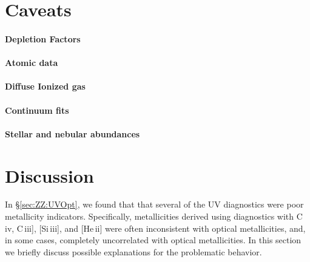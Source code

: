 \documentclass[preprint2]{aastex62}
\newcommand{\heii}{[He\,{\sc ii}]\xspace}
\newcommand{\civ}{C\,{\sc iv}\xspace}
\newcommand{\SiuIII}{[Si\,{\sc iii}]\xspace}
\newcommand{\ciii}{C\,{\sc iii}]\xspace}
\begin{document}
\section{Caveats}\label{sec:caveats}

\paragraph{Depletion Factors}
\paragraph{Atomic data}
\paragraph{Diffuse Ionized gas}
\paragraph{Continuum fits}
\paragraph{Stellar and nebular abundances}

\section{Discussion}\label{sec:discussion}

In \S\ref{sec:ZZ:UVOpt}, we found that that several of the UV diagnostics were poor metallicity indicators. Specifically, metallicities derived using diagnostics with \civ, \ciii, \SiuIII, and \heii were often inconsistent with optical metallicities, and, in some cases, completely uncorrelated with optical metallicities. In this section we briefly discuss possible explanations for the problematic behavior.
\end{document}
